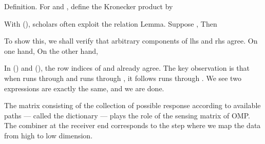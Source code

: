 \Result
{Definition.}
{
For  and , define the Kronecker product  by
}

With (), scholars often exploit the relation
\Result
{Lemma.}
{
Suppose ,
Then
}

To show this, we shall verify that arbitrary components of lhs and rhs agree.
On one hand,
On the other hand,

In () and (), the row indices of  and  already agree.
The key observation is that when  runs through  and  runs through , it follows  runs through .
We see two expressions are exactly the same, and we are done.

The matrix consisting of the collection of possible response according to available paths --- called the dictionary --- plays the role of the sensing matrix of OMP.
The combiner at the receiver end corresponds to the step where we map the data from high to low dimension.

\stopsection

\startsection [title={Further Development}]

